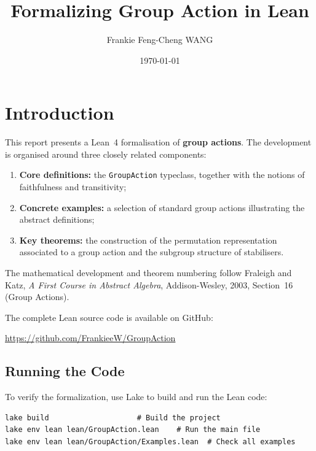 \documentclass[
  12pt, %
]{assignment}
\title{Formalizing Group Action in Lean} %
\author{Frankie Feng-Cheng WANG} %
\date{\today} %
\institute{Department of Mathematics\\Imperial College London} %
\begin{document}
\setcounter{tocdepth}{3}
\maketitle %
\tableofcontents

\section{Introduction}

This report presents a Lean~4 formalisation of \textbf{group actions}.
The development is organised around three closely related components:

\begin{enumerate}
	\item \textbf{Core definitions:} the \texttt{GroupAction} typeclass, together with
	      the notions of faithfulness and transitivity;
	\item \textbf{Concrete examples:} a selection of standard group actions illustrating
	      the abstract definitions;
	\item \textbf{Key theorems:} the construction of the permutation representation
	      associated to a group action and the subgroup structure of stabilisers.
\end{enumerate}

The mathematical development and theorem numbering follow
Fraleigh and Katz, \textit{A First Course in Abstract Algebra},
Addison-Wesley, 2003, Section~16 (Group Actions).

The complete Lean source code is available on GitHub:
\begin{center}
	\url{https://github.com/FrankieeW/GroupAction}
\end{center}

\subsection{Running the Code}
To verify the formalization, use Lake to build and run the Lean code:
\begin{verbatim}
lake build                    # Build the project
lake env lean lean/GroupAction.lean    # Run the main file
lake env lean lean/GroupAction/Examples.lean  # Check all examples
\end{verbatim}
\end{document}
